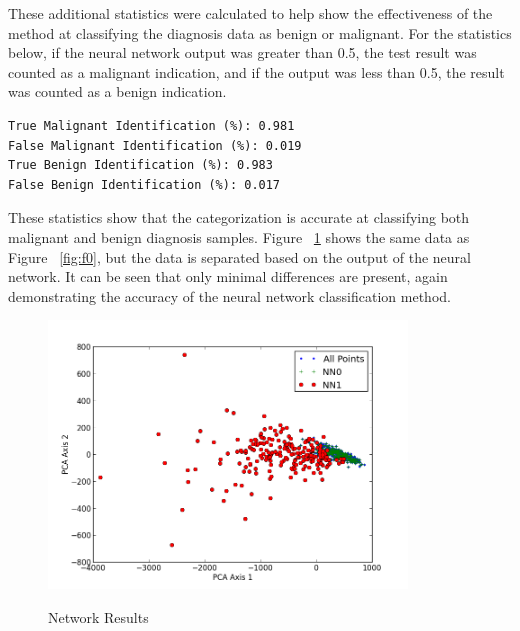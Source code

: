 \documentclass{article}
\begin{document}
These additional statistics were calculated to help show the effectiveness of the method 
at classifying the diagnosis data as benign or malignant.  For the statistics below,
if the neural network output was greater than 0.5, the test result was counted as a
malignant indication, and if the output was less than 0.5, the result was counted as a benign indication.
\vspace*{1\baselineskip}      
\begin{verbatim}
True Malignant Identification (%): 0.981
False Malignant Identification (%): 0.019
True Benign Identification (%): 0.983
False Benign Identification (%): 0.017
\end{verbatim}
\vspace*{1\baselineskip}      
These statistics show that the categorization is accurate at classifying both malignant and benign diagnosis samples.
Figure ~\ref{fig:f2} shows the same data as Figure ~\ref{fig:f0}, but the data is separated based 
on the output of the neural network.  It can be seen that only minimal differences are present,
again demonstrating the accuracy of the neural network classification method.
\begin{figure}[h!]
\caption{Network Results}
  \centering
    \includegraphics[width=0.85\textwidth]{figure_2.png}
  \label{fig:f2}
\end{figure}
\end{document}
